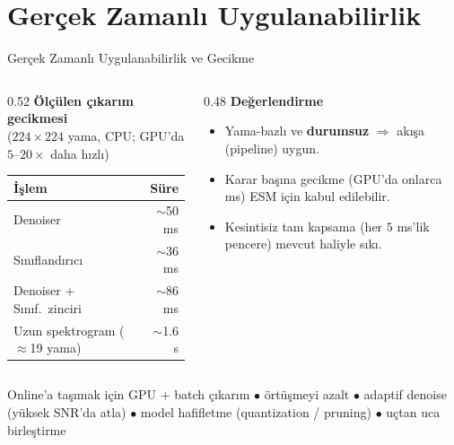 \documentclass[aspectratio=169]{beamer}
\begin{document}
\section{Gerçek Zamanlı Uygulanabilirlik}
\begin{frame}{Gerçek Zamanlı Uygulanabilirlik ve Gecikme}
  \begin{columns}[T]
    \begin{column}{0.52\textwidth}
      \textbf{Ölçülen çıkarım gecikmesi}\\[1pt]
      {\scriptsize ($224\times224$ yama, CPU; GPU'da $5$--$20\times$ daha hızlı)}
      \vspace{1.5mm}
      \renewcommand{\arraystretch}{1.25}
      \begin{tabular}{@{}lr@{}}
        \toprule
        \textbf{İşlem} & \textbf{Süre} \\
        \midrule
        Denoiser                        & $\sim$50 ms \\
        Sınıflandırıcı                  & $\sim$36 ms \\
        Denoiser $+$ Sınıf.\ zinciri     & $\sim$86 ms \\
        Uzun spektrogram ($\approx$19 yama) & $\sim$1.6 s \\
        \bottomrule
      \end{tabular}
    \end{column}
    \begin{column}{0.48\textwidth}
      \textbf{Değerlendirme}
      \begin{itemize}\small
        \item Yama-bazlı ve \textbf{durumsuz} $\Rightarrow$ akışa (pipeline) uygun.
        \item Karar başına gecikme (GPU'da onlarca ms) ESM için kabul edilebilir.
        \item Kesintisiz tam kapsama (her $5$ ms'lik pencere) mevcut haliyle sıkı.
      \end{itemize}
    \end{column}
  \end{columns}
  \vspace{1.5mm}
  \begin{block}{Online'a taşımak için}\small
    GPU $+$ batch çıkarım \;$\bullet$\; örtüşmeyi azalt \;$\bullet$\;
    adaptif denoise (yüksek SNR'da atla) \;$\bullet$\; model hafifletme
    (quantization / pruning) \;$\bullet$\; uçtan uca birleştirme
  \end{block}
\end{frame}
\end{document}
